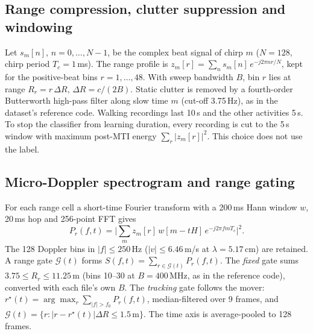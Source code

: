 \documentclass[11pt,a4paper]{article}
\begin{document}
\subsection{Range compression, clutter suppression and windowing}
Let $s_m[n]$, $n=0,\dots,N-1$, be the complex beat signal of chirp $m$ ($N=128$, chirp period $T_c=1$\,ms). The range profile is
$z_m[r]=\sum_{n} s_m[n]\,e^{-j2\pi nr/N}$, kept for the positive-beat bins $r=1,\dots,48$. With sweep bandwidth $B$, bin $r$ lies at range $R_r = r\,\Delta R$, $\Delta R=c/(2B)$. Static clutter is removed by a fourth-order Butterworth high-pass filter along slow time $m$ (cut-off 3.75\,Hz), as in the dataset's reference code. Walking recordings last 10\,s and the other activities 5\,s. To stop the classifier from learning duration, every recording is cut to the 5\,s window with maximum post-MTI energy $\sum_r |z_m[r]|^2$. This choice does not use the label.

\subsection{Micro-Doppler spectrogram and range gating}
For each range cell a short-time Fourier transform with a 200\,ms Hann window $w$, 20\,ms hop and 256-point FFT gives
\begin{equation}
P_r(f,t)=\Big|\sum_{m} z_{m}[r]\,w[m-tH]\,e^{-j2\pi f m T_c}\Big|^2 .
\end{equation}
The 128 Doppler bins in $|f|\le 250$\,Hz ($|v|\le 6.46$\,m/s at $\lambda=5.17$\,cm) are retained. A range gate $\mathcal{G}(t)$ forms $S(f,t)=\sum_{r\in\mathcal{G}(t)}P_r(f,t)$. The \emph{fixed} gate sums $3.75\le R_r\le 11.25$\,m (bins 10--30 at $B=400$\,MHz, as in the reference code), converted with each file's own $B$. The \emph{tracking} gate follows the mover: $r^\star(t)=\arg\max_r \sum_{|f|>f_0}P_r(f,t)$, median-filtered over 9 frames, and $\mathcal{G}(t)=\{r: |r-r^\star(t)|\Delta R\le 1.5\,\text{m}\}$. The time axis is average-pooled to 128 frames.
\end{document}
